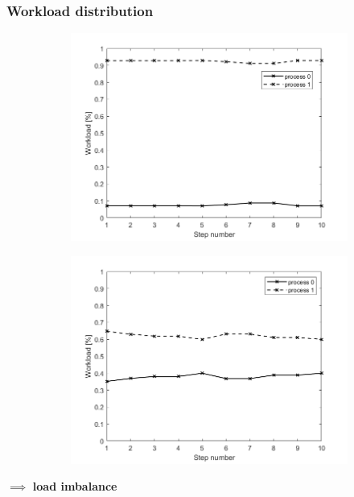 \documentclass{beamer}
\begin{document}
\begin{frame} %
	\frametitle{Workload distribution}
	\begin{figure}
		\begin{subfigure}{.5\textwidth}
			\includegraphics[width=\linewidth]{etc/test_5_workload.jpeg}
		\end{subfigure}%
		\begin{subfigure}{.5\textwidth}
			\includegraphics[width=\linewidth]{etc/test_6_workload.jpeg}
		\end{subfigure}
	\end{figure}
\begin{center}
	\vspace{16pt}
	$\implies$ \textbf{load imbalance}
\end{center}
\end{frame}
\end{document}

